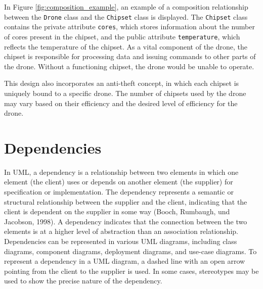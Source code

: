 \documentclass[
	12pt,
    a4paper,
    egregdoesnotlikesansseriftitles, %
    toc=chapterentrywithdots,
    oneside, openany,
    titlepage,
    parskip=half,
    headings=normal,  %
    listof=totoc,
    bibliography=totoc,
    index=totoc,
    captions=tableheading,  %
    listof=flat,
    numbers=noenddot, %
    final]
    {scrbook}
\begin{document}
In Figure \ref{fig:composition_example}, an example of a composition relationship between the \texttt{Drone} class and the \texttt{Chipset} class is displayed. The \texttt{Chipset} class contains the private attribute \texttt{cores}, which stores information about the number of cores present in the chipset, and the public attribute \texttt{temperature}, which reflects the temperature of the chipset. As a vital component of the drone, the chipset is responsible for processing data and issuing commands to other parts of the drone. Without a functioning chipset, the drone would be unable to operate.

This design also incorporates an anti-theft concept, in which each chipset is uniquely bound to a specific drone. The number of chipsets used by the drone may vary based on their efficiency and the desired level of efficiency for the drone.


\section{Dependencies}

In UML, a dependency is a relationship between two elements in which one element (the client) uses or depends on another element (the supplier) for specification or implementation.
The dependency represents a semantic or structural relationship between the supplier and the client, indicating that the client is dependent on the supplier in some way (Booch, Rumbaugh, und Jacobson, 1998).
A dependency indicates that the connection between the two elements is at a higher level of abstraction than an association relationship.
Dependencies can be represented in various UML diagrams, including class diagrams, component diagrams, deployment diagrams, and use-case diagrams. 
To represent a dependency in a UML diagram, a dashed line with an open arrow pointing from the client to the supplier is used. 
In some cases, stereotypes may be used to show the precise nature of the dependency.
\end{document}
